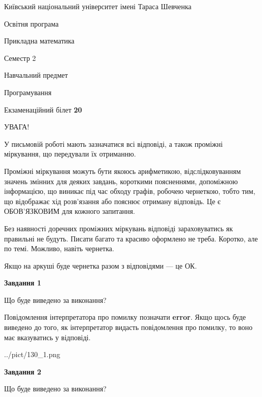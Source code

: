 \documentclass[12pt, ukrainian]{article}
\begin{document}
{{\begin {small}\par
{ \center  Київський національний університет імені Тараса Шевченка \par}
{\parbox {5 cm}{Освітня програма \hfill}{\parbox {7 cm}{Прикладна математика \hfill}}\parbox {6 cm}{\hfill Семестр 2}}\par
{\parbox {5 cm} {Навчальний предмет \hfill}\parbox {7 cm}{Програмування \hfill}\parbox {6cm}{\hfill}\par}\vspace{-7pt} \end{small}}{\center Екзаменаційний білет \No \textbf
{ 20 }\par}}
{
\begin {large}
УВАГА!

У письмовій роботі мають зазначатися всі відповіді, а також проміжні міркування, що передували їх отриманню.

Проміжні міркування можуть бути якоюсь арифметикою, відслідковуванням зна\-чень змінних для деяких завдань,
короткими поясненнями, допоміжною інформацією, що виникає під час обходу графів, робочею чернеткою,
тобто тим, що відображає хід розв’язання або пояснює отриману відповідь.
Це є ОБОВ’ЯЗКОВИМ для кожного запитання.

Без наявності доречних проміжних міркувань відповіді зараховуватись як правиль\-ні не будуть.
Писати багато та красиво оформлено не треба. Коротко, але по темі. Можли\-во, навіть чернетка.

Якщо на аркуші буде чернетка разом з відповідями --- це ОК.

\newpage

{\begin {center}\textbf{Завдання 1}\end {center}}\par
Що буде виведено за виконання?

Повідомлення інтерпретатора про помилку позначати \textbf{error}.
Якщо щось буде виведено до того, як інтерпретатор видасть повідомлення про помилку, 
то воно має вказуватись у відповіді. \par


\begin{center}
	{../pict/130_1.png}
\end{center}
\newpage

{\begin {center}\textbf{Завдання 2}\end {center}}\par
Що буде виведено за виконання?


\end{large}}
\end{document}
